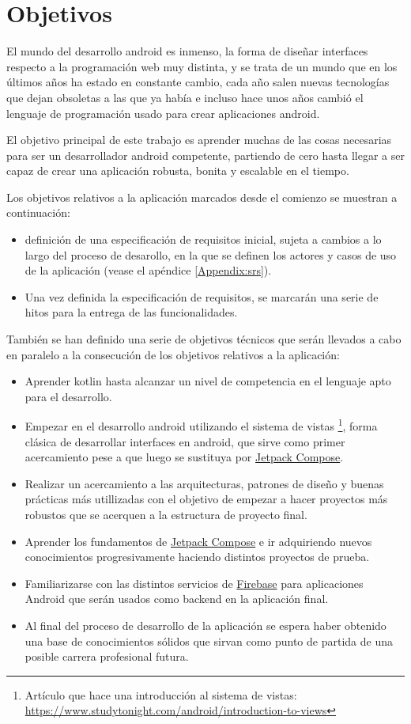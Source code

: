 \section{Objetivos}
El mundo del desarrollo android es inmenso, la forma de diseñar interfaces respecto a la programación web muy distinta, y se trata de un mundo que en los últimos años ha estado en constante cambio, cada año salen nuevas tecnologías que dejan obsoletas a las que ya había e incluso hace unos años cambió el lenguaje de programación usado para crear aplicaciones android.

El objetivo principal de este trabajo es aprender muchas de las cosas necesarias para ser un desarrollador android competente, partiendo de cero hasta llegar a ser capaz de crear una aplicación robusta, bonita y escalable en el tiempo. 

Los objetivos relativos a la aplicación marcados desde el comienzo se muestran a continuación:
\begin{itemize}
	\item definición de una especificación de requisitos inicial, sujeta a cambios a lo largo del proceso de desarollo, en la que se definen los actores y casos de uso de la aplicación (vease el apéndice \ref{Appendix:srs}).
	\item Una vez definida la especificación de requisitos, se marcarán una serie de hitos para la entrega de las funcionalidades.
\end{itemize}

También se han definido una serie de objetivos técnicos que serán llevados a cabo en paralelo a la consecución de los objetivos relativos a la aplicación:
\begin{itemize}
	\item Aprender kotlin hasta alcanzar un nivel de competencia en el lenguaje apto para el desarrollo.
	\item Empezar en el desarrollo android utilizando el sistema de vistas \footnote{Artículo que hace una introducción al sistema de vistas: \url{https://www.studytonight.com/android/introduction-to-views} }, forma clásica de desarrollar interfaces en android, que sirve como primer acercamiento pese a que luego se sustituya por \hyperlink{subsec:compose}{Jetpack Compose}. 
	\item Realizar un acercamiento a las arquitecturas, patrones de diseño y buenas prácticas más utillizadas con el objetivo de empezar a hacer proyectos más robustos que se acerquen a la estructura de proyecto final.
	\item Aprender los fundamentos de \hyperlink{subsec:compose}{Jetpack Compose} e ir adquiriendo nuevos conocimientos progresivamente haciendo distintos proyectos de prueba.
	\item Familiarizarse con las distintos servicios de \hyperlink{subsec:firebase}{Firebase} para aplicaciones Android que serán usados como backend en la aplicación final.
	\item Al final del proceso de desarrollo de la aplicación se espera haber obtenido una base de conocimientos sólidos que sirvan como punto de partida de una posible carrera profesional futura.
\end{itemize}

